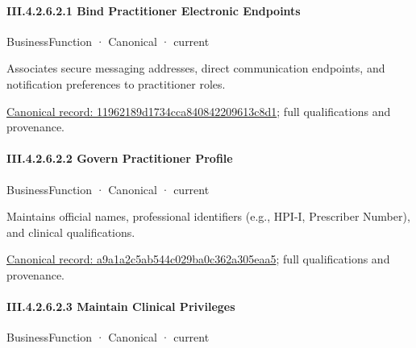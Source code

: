 \paragraph*{III.4.2.6.2.1 Bind Practitioner Electronic Endpoints}
\label{navigation:III.4.2.6.2.1}

\label{element:11962189d1734cca840842209613c8d1}
{\small BusinessFunction · Canonical · current}\par

Associates secure messaging addresses, direct communication endpoints, and notification preferences to practitioner roles.


{\footnotesize \href{../../../../continuum/business/business-function/11962189d1734cca840842209613c8d1.md}{Canonical record: 11962189d1734cca840842209613c8d1}; full qualifications and provenance.}\par
\paragraph*{III.4.2.6.2.2 Govern Practitioner Profile}
\label{navigation:III.4.2.6.2.2}

\label{element:a9a1a2c5ab544c029ba0c362a305eaa5}
{\small BusinessFunction · Canonical · current}\par

Maintains official names, professional identifiers (e.g., HPI-I, Prescriber Number), and clinical qualifications.


{\footnotesize \href{../../../../continuum/business/business-function/a9a1a2c5ab544c029ba0c362a305eaa5.md}{Canonical record: a9a1a2c5ab544c029ba0c362a305eaa5}; full qualifications and provenance.}\par
\paragraph*{III.4.2.6.2.3 Maintain Clinical Privileges}
\label{navigation:III.4.2.6.2.3}

\label{element:4965ae4538cc42cd8af1bd9a1905b108}
{\small BusinessFunction · Canonical · current}\par


